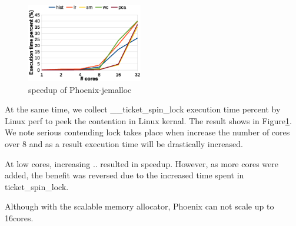 \begin{figure}[!h!t]  
	\centering
	\includegraphics[width=0.45\textwidth]{eps/phoenix_spinlock_jemalloc.eps}
	\caption{speedup of Phoenix-jemalloc}
	\label{fig:phoenix:spinlock:jemalloc}
\end{figure}
At the same time, we collect \_\_ticket\_spin\_lock execution time percent by Linux perf to peek the contention in Linux kernal.
The result shows in Figure\ref{fig:phoenix:spinlock:jemalloc}.
We note serious contending lock takes place when increase the number of cores over 8 and as a result execution time will be drastically increased.

At low cores, increasing .. resulted in speedup.
However, as more cores were added, the benefit was reversed due to the increased time spent in ticket\_spin\_lock. 


Although with the scalable memory allocator, Phoenix can not scale up to 16cores.
 
